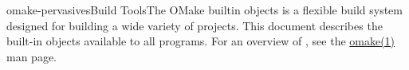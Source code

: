 %
%
%
\begin{Name}{1}{omake-pervasives}{\authors}{Build Tools}{The OMake builtin objects}
   is a flexible build system designed for building a wide variety of projects.
  This document describes the built-in objects available to all programs.
  For an overview of , see the \href{omake.html}{omake(1)} man page.
\end{Name}

